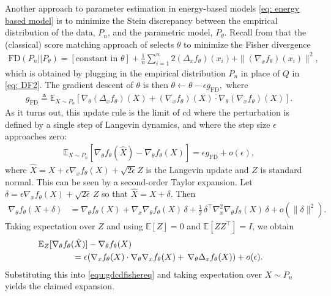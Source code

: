 \documentclass[12pt,paper=letter]{scrreprt}
\def\mbb#1{\mathbb{#1}}
\def\defeq{\triangleq} %
\def\E{\mbb{E}} %
\newcommand{\vtheta}{\theta}
\begin{document}
Another approach to parameter estimation in  energy-based models \eqref{eq: energy based model} is to 
minimize the Stein discrepancy between the empirical distribution of the data, $P_n$, and the parametric model, $P_\theta$. 
Recall from  that the (classical) score matching approach of \citet{hyvarinen2005estimation} selects $\theta$ to minimize the Fisher divergence
\begin{align*}
    \mathrm{FD}(P_n||P_\theta) = [\text{constant in $\theta$}] + \frac{1}{n} \sum_{i=1}^n  2 (\Delta_x f_\theta)(x_i) + \|(\nabla_x f_\theta)(x_i)\|^2  ,
\end{align*}
which is obtained by plugging in the empirical distribution $P_n$ in place of $Q$ in \eqref{eq: DF2}.
The gradient descent of $\theta$ is then $\vtheta \gets \vtheta - \epsilon  g_{\mathrm{FD}},$ where 
\begin{align}
\label{eq: grad update FD} 
g_{\mathrm{FD}} \defeq  \E_{X \sim P_n} [\nabla_\vtheta (\Delta_x f_\theta) (X) + (\nabla_x f_\theta)(X) \cdot \nabla_\vtheta (\nabla_x f_\theta)(X) ]. 
\end{align}
As it turns out, this update rule is the limit of \ac{cd} where the perturbation is defined by a single step of Langevin dynamics, and where the step size $\epsilon$ approaches zero: 
\begin{align} \label{equ:gdcdfishereq}
\E_{X \sim P_n} [\nabla_\theta f_\theta(\hat X) - \nabla_\theta f_\theta(X)] 
= \epsilon g_{\mathrm{FD}}  +o(\epsilon),  
\end{align}
where $\hat X = X + {\epsilon} \nabla_x f_\theta(X) + \sqrt{2\epsilon} Z$ is the Langevin update and $Z$ is standard normal. 
This can be seen by a second-order Taylor expansion. Let 
\(
\delta = \epsilon \nabla_xf_\theta(X) + \sqrt{2\epsilon}\, Z
\) so that $\hat X = X + \delta$. 
Then
\begin{align*}
\nabla_\theta f_\theta(X+\delta)
&= \nabla_\theta f_\theta(X)
  + \nabla_x \nabla_\theta f_\theta(X)\,\delta
  + \tfrac12\, \delta^\top \nabla_x^2 \nabla_\theta f_\theta(X)\,\delta
  + o(\|\delta\|^2).
\end{align*}
Taking expectation over \(Z\) and using \(\E[Z]=0\) and \(\E[ZZ^\top]=I\), we obtain
\begin{align*}
& \hspace{-20pt} \E_Z[\nabla_\theta f_\theta(\hat X)]- \nabla_\theta f_\theta(X) \\
& \hspace{20pt} = \epsilon (\nabla_x f_\theta(X)\cdot \nabla_\theta\nabla_x f_\theta(X)
+ \,\nabla_\theta \Delta_x f_\theta(X))
+ o(\epsilon).
\end{align*}
Substituting this into \eqref{equ:gdcdfishereq}  and taking expectation over
\(X\sim P_n\) yields the claimed expansion.
\end{document}
